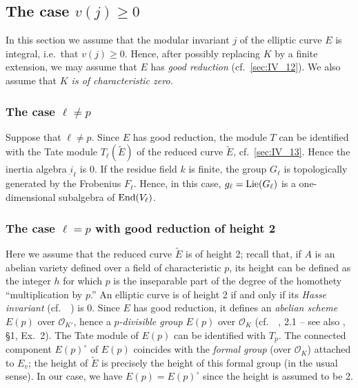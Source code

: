 \begin{subappendices}
\subsection{The case \texorpdfstring{$v(j) \ge 0$}{v(j) ≥ 0}}
\label{sec:IV_A2}
In this section we assume that the modular invariant $j$ of the elliptic curve
$E$ is integral, i.e.\ that $v(j) \ge 0$. Hence, after possibly replacing $K$
by a finite extension, we may assume that $E$ has \emph{good reduction} (cf.\
\ref{sec:IV_12}). We also assume that \emph{$K$ is of characteristic zero.}

\subsubsection{The case \texorpdfstring{$\ell \ne p$}{ℓ ̸/= p}}
\label{sec:IV_A21}

Suppose that $\ell \neq p$. Since $E$ has good reduction, the module
$T$ can be identified with the Tate module $T_\ell(\tilde{E})$ of the reduced
curve $\tilde{E}$, cf.\ \ref{sec:IV_13}. Hence the inertia algebra
$\underbar{i}_\ell$ is $0$. If the residue field $k$ is finite, the group
$G_\ell$ is topologically generated by the Frobenius $F_\ell$. Hence, in this
case, $g_\ell = \operatorname{Lie}(G_\ell)$ is a one-dimensional subalgebra of $\operatorname{End}(V_\ell)$.

\subsubsection{The case \texorpdfstring{$\ell = p$}{ℓ = p} with good
reduction of height 2}
\label{sec:IV_A22}
Here we assume that the reduced curve $\widetilde{E}$ is of height 2; recall
that, if $A$ is an abelian variety defined over a field of characteristic $p$,
its height can be defined as the integer $h$ for which $p$ is the inseparable
part of the degree of the homothety ``multiplication by $p$.'' An elliptic
curve is of height 2 if and only if its \emph{Hasse invariant} (cf.\
\citeauthor{9}~\cite{9}) is 0. Since $E$ has good reduction, it defines an
\emph{abelian scheme} $E(p)$ over $\mathcal{O}_{K'}$, hence a
\emph{$p$-divisible group} $E(p)$ over $\mathcal{O}_K$ (cf.\
\citeauthor{39}~\cite{39}, 2.1 -- see also \cite{26}, \S1, Ex.~2).  The Tate
module of $E(p)$ can be identified with $T_p$. The connected component
$E(p)^\circ$ of $E(p)$ coincides with the \emph{formal group} (over
$\mathcal{O}_K$) attached to $E_v$; the height of $\widetilde{E}$ is precisely
the height of this formal group (in the usual sense). In our case, we have
$E(p) = E(p)^\circ$ since the height is assumed to be 2.


\end{subappendices}
